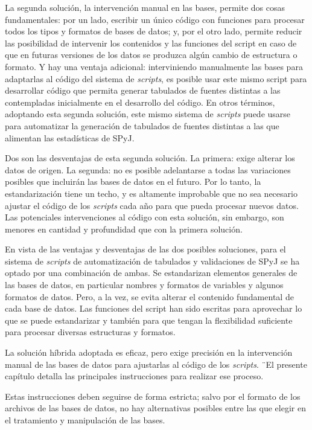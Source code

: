 \documentclass[
  spanish,
]{book}
\begin{document}
La segunda solución, la intervención manual en las bases, permite dos cosas fundamentales: por un lado, escribir un único código con funciones para procesar todos los tipos y formatos de bases de datos; y, por el otro lado, permite reducir las posibilidad de intervenir los contenidos y las funciones del script en caso de que en futuras versiones de los datos se produzca algún cambio de estructura o formato. Y hay una ventaja adicional: interviniendo manualmente las bases para adaptarlas al código del sistema de \emph{scripts}, es posible usar este mismo script para desarrollar código que permita generar tabulados de fuentes distintas a las contempladas inicialmente en el desarrollo del código. En otros términos, adoptando esta segunda solución, este mismo sistema de \emph{scripts} puede usarse para automatizar la generación de tabulados de fuentes distintas a las que alimentan las estadísticas de SPyJ.

Dos son las desventajas de esta segunda solución. La primera: exige alterar los datos de origen. La segunda: no es posible adelantarse a todas las variaciones posibles que incluirán las bases de datos en el futuro. Por lo tanto, la estandarización tiene un techo, y es altamente improbable que no sea necesario ajustar el código de los \emph{scripts} cada año para que pueda procesar nuevos datos. Las potenciales intervenciones al código con esta solución, sin embargo, son menores en cantidad y profundidad que con la primera solución.

En vista de las ventajas y desventajas de las dos posibles soluciones, para el sistema de \emph{scripts} de automatización de tabulados y validaciones de SPyJ se ha optado por una combinación de ambas. Se estandarizan elementos generales de las bases de datos, en particular nombres y formatos de variables y algunos formatos de datos. Pero, a la vez, se evita alterar el contenido fundamental de cada base de datos. Las funciones del script han sido escritas para aprovechar lo que se puede estandarizar y también para que tengan la flexibilidad suficiente para procesar diversas estructuras y formatos.

La solución híbrida adoptada es eficaz, pero exige precisión en la intervención manual de las bases de datos para ajustarlas al código de los \emph{scripts}. ¨El presente capítulo detalla las principales instrucciones para realizar ese proceso.

Estas instrucciones deben seguirse de forma estricta; salvo por el formato de los archivos de las bases de datos, no hay alternativas posibles entre las que elegir en el tratamiento y manipulación de las bases.
\end{document}
